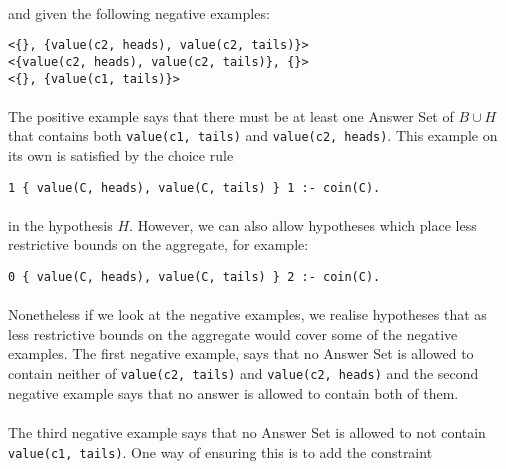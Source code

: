 \documentclass{article}
\theoremstyle{plain}
\theoremstyle{definition}
\begin{document}
\begin{multicols}{2}
\paragraph{} and given the following negative examples:

\begin{lstlisting}
<{}, {value(c2, heads), value(c2, tails)}>
<{value(c2, heads), value(c2, tails)}, {}>
<{}, {value(c1, tails)}>
\end{lstlisting}

\paragraph{} The positive example says that there must be at least one Answer Set of $B \cup H$ that contains both \lstinline{value(c1, tails)} and \lstinline{value(c2, heads)}. This example on its own is satisfied by the choice rule 

\begin{lstlisting}
1 { value(C, heads), value(C, tails) } 1 :- coin(C).
\end{lstlisting}

\paragraph{} in the hypothesis $H$. However, we can also allow hypotheses which place less restrictive bounds on the aggregate, for example:

\begin{lstlisting}
0 { value(C, heads), value(C, tails) } 2 :- coin(C).
\end{lstlisting}

\paragraph{} Nonetheless if we look at the negative examples, we realise hypotheses that as less restrictive bounds on the aggregate would cover some of the negative examples. The first negative example, says that no Answer Set is allowed to contain neither of \lstinline{value(c2, tails)} and \lstinline{value(c2, heads)} and the second negative example says that no answer is allowed to contain both of them. 

\paragraph{} The third negative example says that no Answer Set is allowed to not contain \lstinline{value(c1, tails)}. One way of ensuring this is to add the constraint


\end{multicols}
\end{document}
